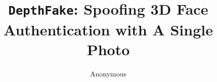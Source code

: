 \documentclass[conference,compsoc]{IEEEtran}
\begin{document}
	\pagestyle{plain}

\title{ \Large \bf \texttt{DepthFake}: Spoofing 3D Face Authentication with A Single Photo
\\
}

\author{Anonymous}

\maketitle







% 











\end{document}

